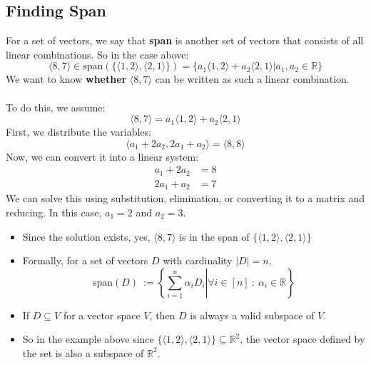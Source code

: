 \documentclass[10pt]{article}
\begin{document}
\subsection*{Finding Span}
For a set of vectors, we say that \textbf{span} is another set of vectors that consists of all linear combinations.  So in the case above:
\[\langle 8, 7 \rangle \in \text{span}(\{\langle 1, 2 \rangle, \langle 2, 1 \rangle\}) = \{a_1 \langle 1, 2 \rangle + a_2 \langle 2, 1 \rangle | a_1, a_2 \in \mathbb{R}\}\]
We want to know \textbf{whether} $\langle 8, 7 \rangle$ can be written as such a linear combination.\\\\
To do this, we assume:
\[\langle 8, 7 \rangle = a_1 \langle 1, 2 \rangle + a_2 \langle 2, 1 \rangle\]
First, we distribute the variables:
\[\langle a_1 + 2a_2, 2 a_1 + a_2 \rangle = \langle 8, 8 \rangle\]
Now, we can convert it into a linear system:
\begin{align*}
    a_1 + 2a_2 &= 8 \\
    2a_1 + a_2 &= 7
\end{align*}
We can solve this using substitution, elimination, or converting it to a matrix and reducing.  In this case, $a_1 = 2$ and $a_2 = 3$.
\begin{itemize}
	\item Since the solution exists, yes, $\langle 8, 7 \rangle$ is in the span of $\{\langle 1, 2 \rangle, \langle 2, 1 \rangle\}$
	\item Formally, for a set of vectors $D$ with cardinality $|D| = n$,
	\[\text{span}(D) \::= \left\{\left.\sum_{i = 1}^n \alpha_i D_i \right\vert \forall i \in [n] \::\: \alpha_i \in \mathbb{R}\right\}\]
    \item If $D \subseteq V$ for a vector space $V$, then $D$ is always a valid subspace of $V$.
    \item So in the example above since $\{\langle 1, 2 \rangle, \langle 2, 1 \rangle\} \subseteq \mathbb{R}^2$, the vector space defined by the set is also a subspace of $\mathbb{R}^2$.
\end{itemize}
\end{document}
